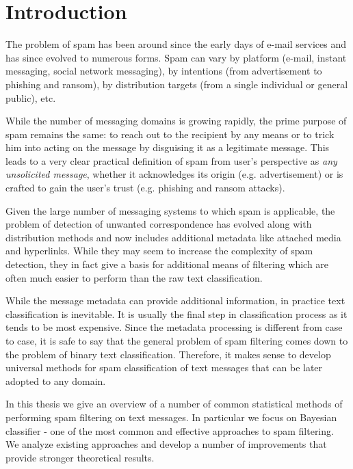 \documentclass[12pt]{report}
\begin{document}
\renewcommand{\bibname}{References}
\setcounter{tocdepth}{1}

\setcounter{page}{2}

\large

\thispagestyle{empty}
\tableofcontents


\chapter*{Introduction}

The problem of spam has been around since the early days of e-mail services and has since evolved to numerous forms. Spam can vary by platform (e-mail, instant messaging, social network messaging), by intentions (from advertisement to phishing and ransom), by distribution targets (from a single individual or general public), etc.

While the number of messaging domains is growing rapidly, the prime purpose of spam remains the same: to reach out to the recipient by any means or to trick him into acting on the message by disguising it as a legitimate message. This leads to a very clear practical definition of spam from user's perspective as \textit{any unsolicited message}, whether it acknowledges its origin (e.g. advertisement) or is crafted to gain the user's trust (e.g. phishing and ransom attacks).

Given the large number of messaging systems to which spam is applicable, the problem of detection of unwanted correspondence has evolved along with distribution methods and now includes additional metadata like attached media and hyperlinks. While they may seem to increase the complexity of spam detection, they in fact give a basis for additional means of filtering which are often much easier to perform than the raw text classification.

While the message metadata can provide additional information, in practice text classification is inevitable. It is usually the final step in classification process as it tends to be most expensive. Since the metadata processing is different from case to case, it is safe to say that the general problem of spam filtering comes down to the problem of binary text classification. Therefore, it makes sense to develop universal methods for spam classification of text messages that can be later adopted to any domain.

In this thesis we give an overview of a number of common statistical methods of performing spam filtering on text messages. In particular we focus on Bayesian classifier - one of the most common and effective approaches to spam filtering. We analyze existing approaches and develop a number of improvements that provide stronger theoretical results.
\end{document}
